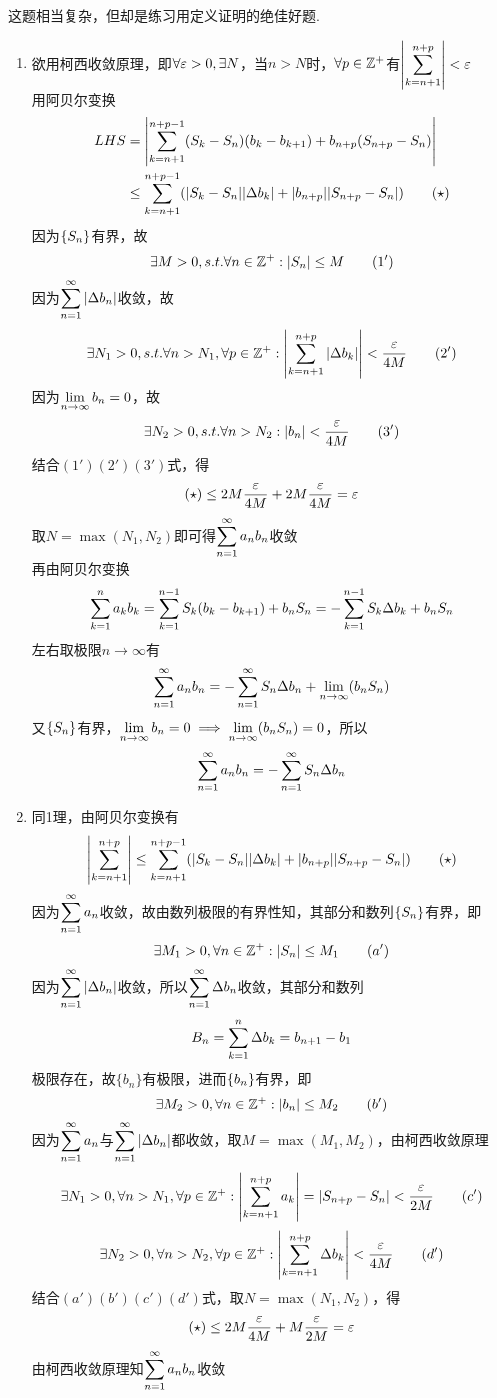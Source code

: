 \begin{analysis}
这题相当复杂，但却是练习用定义证明的绝佳好题.
\begin{enumerate}
	\item 欲用柯西收敛原理，即$\forall\varepsilon>0,\exists N$，当$n>N$时，$\forall p\in\mathbb{Z}^+$有$\displaystyle\left|\sum_{k=n+1}^{n+p}\right|<\varepsilon$\\
	用阿贝尔变换
	\[\begin{aligned}
	LHS&=\left|\sum_{k=n+1}^{n+p-1}(S_k-S_n)(b_k-b_{k+1})+b_{n+p}(S_{n+p}-S_n)\right|\\
	&\leq\sum_{k=n+1}^{n+p-1}(|S_k-S_n||\Delta b_k|+|b_{n+p}||S_{n+p}-S_n|)\qquad(\star)
	\end{aligned}\]
	因为$\{S_n\}$有界，故
	\[\exists M>0,s.t.\forall n\in\mathbb{Z}^+:|S_n|\leq M\qquad(1')\]
	因为$\displaystyle\sum_{n=1}^{\infty}|\Delta b_n|$收敛，故
	\[\exists N_1>0,s.t.\forall n>N_1,\forall p\in\mathbb{Z}^+:\left|\sum_{k=n+1}^{n+p}|\Delta b_k|\right|<\dfrac{\varepsilon}{4M}\qquad(2')\]
	因为$\displaystyle\lim_{n\to\infty}b_n=0$，故
	\[\exists N_2>0,s.t.\forall n>N_2:|b_n|<\dfrac{\varepsilon}{4M}\qquad(3')\]
	结合$(1')(2')(3')$式，得
	\[(\star)\leq 2M\dfrac{\varepsilon}{4M}+2M\dfrac{\varepsilon}{4M}=\varepsilon\]
	取$N=\max(N_1,N_2)$即可得$\displaystyle\sum_{n=1}^{\infty}a_nb_n$收敛\\
	再由阿贝尔变换
	\[\displaystyle\sum_{k=1}^{n}a_kb_k=\sum_{k=1}^{n-1}S_k(b_k-b_{k+1})+b_nS_n=-\sum_{k=1}^{n-1}S_k\Delta b_k+b_nS_n\]
	左右取极限$n\to\infty$有
	\[\displaystyle\sum_{n=1}^{\infty}a_nb_n=-\displaystyle\sum_{n=1}^{\infty}S_n\Delta b_n+\displaystyle\lim_{n\to\infty}(b_nS_n)\]
	又$\{S_n\}$有界，$\displaystyle\lim_{n\to\infty}b_n=0\implies\displaystyle\lim_{n\to\infty}(b_nS_n)=0$，所以
	\[\displaystyle\sum_{n=1}^{\infty}a_nb_n=-\displaystyle\sum_{n=1}^{\infty}S_n\Delta b_n\]
	\item 同1理，由阿贝尔变换有
	\[\left|\sum_{k=n+1}^{n+p}\right|\leq\sum_{k=n+1}^{n+p-1}(|S_k-S_n||\Delta b_k|+|b_{n+p}||S_{n+p}-S_n|)\qquad(\star)\]
	因为$\displaystyle\sum_{n=1}^{\infty}a_n$收敛，故由数列极限的有界性知，其部分和数列$\{S_n\}$有界，即
	\[\exists M_1>0,\forall n\in\mathbb{Z}^+:|S_n|\leq M_1\qquad(a')\]
	因为$\displaystyle\sum_{n=1}^{\infty}|\Delta b_n|$收敛，所以$\displaystyle\sum_{n=1}^{\infty}\Delta b_n$收敛，其部分和数列
	\[B_n=\displaystyle\sum_{k=1}^{n}\Delta b_k=b_{n+1}-b_1\]
	极限存在，故$\{b_n\}$有极限，进而$\{b_n\}$有界，即
	\[\exists M_2>0,\forall n\in\mathbb{Z}^+:|b_n|\leq M_2\qquad(b')\]
	因为$\displaystyle\sum_{n=1}^{\infty}a_n$与$\displaystyle\sum_{n=1}^{\infty}|\Delta b_n|$都收敛，取$M=\max(M_1,M_2)$，由柯西收敛原理
	\[\exists N_1>0,\forall n>N_1,\forall p\in\mathbb{Z}^+:\left|\sum_{k=n+1}^{n+p}a_k\right|=|S_{n+p}-S_n|<\dfrac{\varepsilon}{2M}\qquad(c')\]
	\[\exists N_2>0,\forall n>N_2,\forall p\in\mathbb{Z}^+:\left|\sum_{k=n+1}^{n+p}\Delta b_k\right|<\dfrac{\varepsilon}{4M}\qquad(d')\]
	结合$(a')(b')(c')(d')$式，取$N=\max(N_1,N_2)$，得
	\[(\star)\leq 2M\dfrac{\varepsilon}{4M}+M\dfrac{\varepsilon}{2M}=\varepsilon\]
	由柯西收敛原理知$\displaystyle\sum_{n=1}^{\infty}a_nb_n$收敛
\end{enumerate}
\end{analysis}
